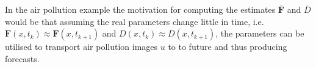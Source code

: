 In the air pollution example the motivation for computing the estimates $\overline{\mathbf{F}}$ and $\overline{D}$ would be that assuming the real parameters change little in time, i.e.\ $\mathbf{F}(x,t_{k}) \approx \mathbf{F}(x,t_{k+1})$ and $D(x,t_{k}) \approx D(x,t_{k+1})$, the parameters can be utilised to transport air pollution images $u$ to to future and thus producing forecasts.
